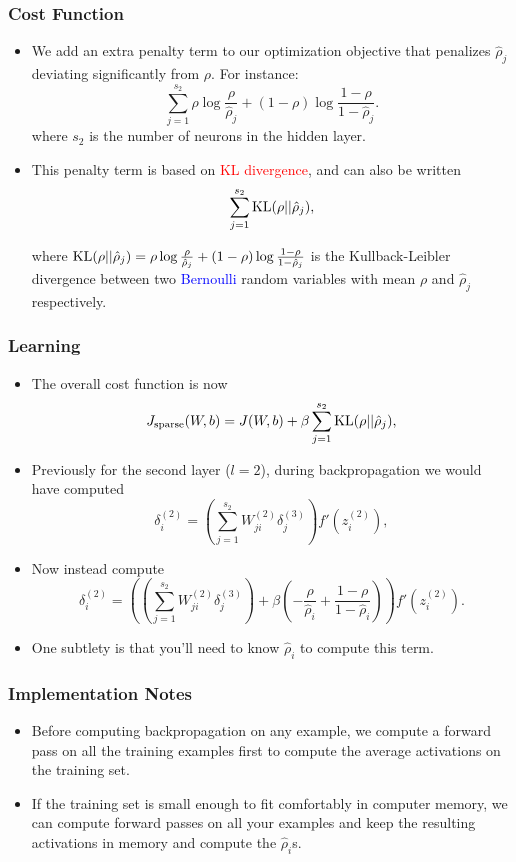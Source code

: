 \documentclass{beamer}
\newcommand{\tr}[1]{\textcolor{red}{#1}} %
\newcommand{\tb}[1]{\textcolor{blue}{#1}} %
\newcommand{\beq}[1]{\vspace{-0.02in}\begin{equation}#1\end{equation}\vspace{-0.02in}}
\begin{document}
\begin{frame}
\frametitle{Cost Function}
\begin{itemize}
\item We add an extra penalty term to our optimization objective that penalizes $\hat\rho_j$ deviating significantly from $\rho$. For instance:
\beq{
\sum_{j=1}^{s_2} \rho \log \frac{\rho}{\hat\rho_j} + (1-\rho) \log \frac{1-\rho}{1-\hat\rho_j}.
}
where $s_2$ is the number of neurons in the hidden layer. 

\item This penalty term is based on \tr{KL divergence}, and can also be written
\beq{
\sum_{j=1}^{s_2} {\rm KL}(\rho || \hat\rho_j),
}

where  ${\rm KL}(\rho || \hat\rho_j)
 = \rho \log \frac{\rho}{\hat\rho_j} + (1-\rho) \log \frac{1-\rho}{1-\hat\rho_j}$ is the Kullback-Leibler divergence between two \tb{Bernoulli} random variables with mean $\rho$ and $\hat\rho_j$ respectively.
\end{itemize}
\end{frame}

\begin{frame}
\frametitle{Learning}
\begin{itemize}
\item The overall cost function is now
\beq{
J_{\rm sparse}(W,b) = J(W,b) + \beta \sum_{j=1}^{s_2} {\rm KL}(\rho || \hat\rho_j),
}

\item  Previously for the second layer ($l=2$), during backpropagation we would have computed
\beq{
\delta^{(2)}_i = \left( \sum_{j=1}^{s_{2}} W^{(2)}_{ji} \delta^{(3)}_j \right) f'(z^{(2)}_i),
}

\item Now instead compute
\beq{
\delta^{(2)}_i =
  \left( \left( \sum_{j=1}^{s_{2}} W^{(2)}_{ji} \delta^{(3)}_j \right)
+ \beta \left( - \frac{\rho}{\hat\rho_i} + \frac{1-\rho}{1-\hat\rho_i} \right) \right) f'(z^{(2)}_i) .
}
\item One subtlety is that you'll need to know $\hat\rho_i$ to compute this term.

\end{itemize}
\end{frame}

\begin{frame}
\frametitle{Implementation Notes}
\begin{itemize}
\item Before computing backpropagation on any example, we compute a forward pass on all the training examples first to compute the average activations on the training set. 
\item If the training set is small enough to fit comfortably in computer memory, we can compute forward passes on all your examples and keep the resulting activations in memory and compute the $\hat\rho_i$s. 
\end{itemize}
\end{frame}
\end{document}
